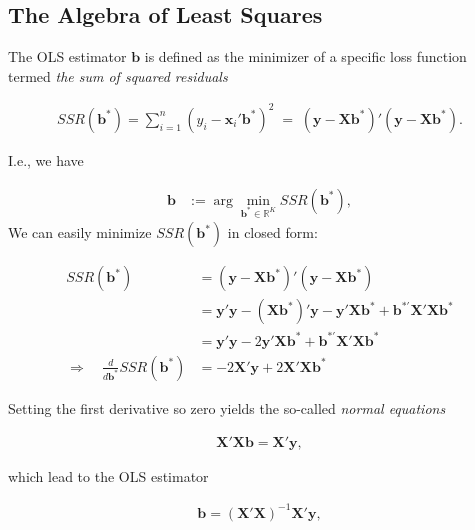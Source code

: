 \documentclass[]{book}
\theoremstyle{definition}
\theoremstyle{definition}
\theoremstyle{definition}
\theoremstyle{remark}
\begin{document}
\hypertarget{the-algebra-of-least-squares}{%
\subsection{The Algebra of Least Squares}\label{the-algebra-of-least-squares}}

The OLS estimator \(\mathbf{b}\) is defined as the minimizer of a specific loss
function termed \emph{the sum of squared residuals}

\[
\begin{align*}
SSR(\mathbf{b}^\ast) = \sum_{i=1}^n(y_i-\mathbf{x}_i'\mathbf{b}^\ast)^2\;=\;(\mathbf{y}-\mathbf{X}\mathbf{b}^\ast)'(\mathbf{y}-\mathbf{X}\mathbf{b}^\ast).
\end{align*}
\]

I.e., we have

\[
\begin{align*}
  \mathbf{b}&:=\arg\min_{\mathbf{b}^\ast\in\mathbb{R}^K}SSR(\mathbf{b}^\ast),
\end{align*}
\]
We can easily minimize \(SSR(\mathbf{b}^\ast)\) in closed form:

\[
\begin{align*}
SSR(\mathbf{b}^\ast) 
&= (\mathbf{y}-\mathbf{X}\mathbf{b}^\ast)'(\mathbf{y}-\mathbf{X}\mathbf{b}^\ast)\\
 &= \mathbf{y}'\mathbf{y}-(\mathbf{X}\mathbf{b}^{\ast})'\mathbf{y}-\mathbf{y}'\mathbf{X}\mathbf{b}^{\ast}+\mathbf{b}^{\ast'}\mathbf{X}'\mathbf{X}\mathbf{b}^{\ast}\\
    &= \mathbf{y}'\mathbf{y}-2\mathbf{y}'\mathbf{X}\mathbf{b}^{\ast}+\mathbf{b}^{\ast'}\mathbf{X}'\mathbf{X}\mathbf{b}^{\ast}\\[2ex]
   \Rightarrow\quad\frac{d}{d\mathbf{b}^{\ast}}SSR(\mathbf{b}^{\ast}) &= -2\mathbf{X}'\mathbf{y}+2\mathbf{X}'\mathbf{X}\mathbf{b}^{\ast}
\end{align*}
\]

Setting the first derivative so zero yields the so-called \emph{normal
equations}

\[
\begin{align*}
\mathbf{X}'\mathbf{X}\mathbf{b} = \mathbf{X}'\mathbf{y},
\end{align*}
\]

which lead to the OLS estimator

\[
\begin{align*}
\mathbf{b} = (\mathbf{X}'\mathbf{X})^{-1}\mathbf{X}'\mathbf{y},
\label{eq:c3e7}
\end{align*}
\]
\end{document}
